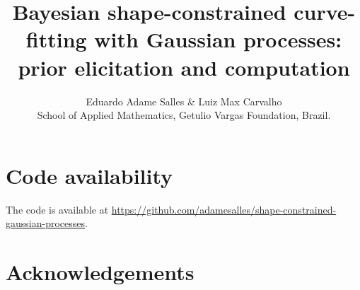 \documentclass[a4paper, notitlepage, 12pt]{article}
\title{\vspace{-9ex}\centering \bf Bayesian shape-constrained curve-fitting with Gaussian processes: prior elicitation and computation}
\author{
Eduardo Adame Salles  \&
Luiz Max Carvalho\\
School of Applied Mathematics, Getulio Vargas Foundation, Brazil.
}
\begin{document}
\maketitle













\section*{Code availability}
\label{sec:code}

The code is available at \url{https://github.com/adamesalles/shape-constrained-gaussian-processes}.

\section*{Acknowledgements}


\newpage



\newpage
\appendix

\setcounter{table}{0}
\renewcommand{\thetable}{S\arabic{table}}
\renewcommand{\thefigure}{S\arabic{figure}}



\end{document}
